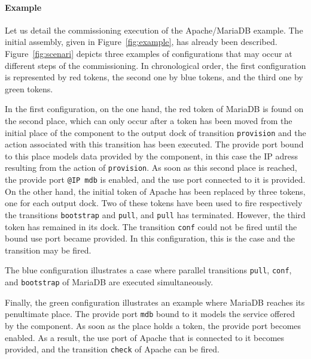 \paragraph{Example}{
Let us detail the commissioning execution of the Apache/MariaDB
example. The initial assembly, given in Figure~\ref{fig:example}, has
already been described. Figure~\ref{fig:scenari} depicts three examples of
configurations that may occur at different steps of the
commissioning. In chronological order, the first configuration is
represented by red tokens, the second one by blue tokens, and the
third one by green tokens.

In the first configuration, on the one hand, the red token of MariaDB
is found on the second place, which can only occur after a token has
been moved from the initial place of the component to the output dock
of transition \texttt{provision} and the action associated with this
transition has been executed. The provide port bound to this place
models data provided by the component, in this case the IP adress
resulting from the action of \texttt{provision}. As soon as this
second place is reached, the provide port \texttt{@IP mdb} is enabled,
and the use port connected to it is provided. On the other hand, the
initial token of Apache has been replaced by three tokens, one for
each output dock. Two of these tokens have been used to fire
respectively the transitions \texttt{bootstrap} and \texttt{pull}, and
\texttt{pull} has terminated. However, the third token has remained in
its dock. The transition \texttt{conf} could not be fired until the
bound use port became provided. In this configuration, this is the
case and the transition may be fired.

The blue configuration illustrates a case where parallel transitions
\texttt{pull}, \texttt{conf}, and \texttt{bootstrap} of MariaDB are
executed simultaneously.

Finally, the green configuration illustrates an example where MariaDB
reaches its penultimate place. The provide port \texttt{mdb} bound to
it models the service offered by the component. As soon as the place
holds a token, the provide port becomes enabled. As a result, the use
port of Apache that is connected to it becomes provided, and the
transition \texttt{check} of Apache can be fired.}
